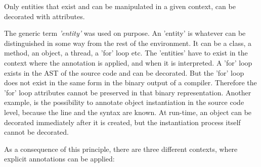 \begin{principle}
\label{pri:tagTarget}
Only entities that exist and can be manipulated in a given context, can be decorated with attributes.
\end{principle}

\noindent The generic term \textit{'entity'} was used on purpose. An 'entity' is whatever can be distinguished in some way from the rest of the environment. It can be a class, a method, an object, a thread, a 'for' loop etc. 
The 'entities' have to exist in the context where the annotation is applied, and when it is interpreted. A 'for' loop exists in the AST of the source code and can be decorated. But the 'for' loop does not exist in the same form in the binary output of a compiler. Therefore the 'for' loop attributes cannot be preserved in that binary representation. Another example, is the possibility to annotate object instantiation in the source code level, because the line and the syntax are known. At run-time, an object can be decorated immediately after it is created, but the instantiation process itself cannot be decorated. 

As a consequence of this principle, there are three different contexts, where explicit annotations can be applied:

